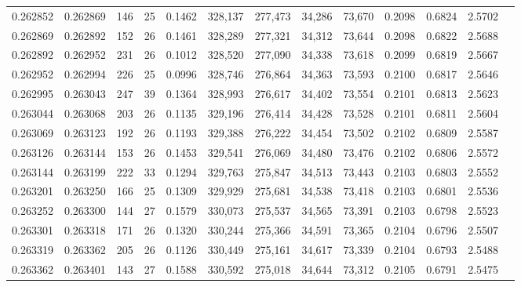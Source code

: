 \begin{tabular}{rrrrrrrrrrrrr}
0.262852 & 0.262869 &   146 &  25 &                                     0.1462 & 328,137 & 277,473 &  34,286 &  73,670 & 0.2098 & 0.6824 & 2.5702 \\
0.262869 & 0.262892 &   152 &  26 &                                     0.1461 & 328,289 & 277,321 &  34,312 &  73,644 & 0.2098 & 0.6822 & 2.5688 \\
0.262892 & 0.262952 &   231 &  26 &                                     0.1012 & 328,520 & 277,090 &  34,338 &  73,618 & 0.2099 & 0.6819 & 2.5667 \\
0.262952 & 0.262994 &   226 &  25 &                                     0.0996 & 328,746 & 276,864 &  34,363 &  73,593 & 0.2100 & 0.6817 & 2.5646 \\
0.262995 & 0.263043 &   247 &  39 &                                     0.1364 & 328,993 & 276,617 &  34,402 &  73,554 & 0.2101 & 0.6813 & 2.5623 \\
0.263044 & 0.263068 &   203 &  26 &                                     0.1135 & 329,196 & 276,414 &  34,428 &  73,528 & 0.2101 & 0.6811 & 2.5604 \\
0.263069 & 0.263123 &   192 &  26 &                                     0.1193 & 329,388 & 276,222 &  34,454 &  73,502 & 0.2102 & 0.6809 & 2.5587 \\
0.263126 & 0.263144 &   153 &  26 &                                     0.1453 & 329,541 & 276,069 &  34,480 &  73,476 & 0.2102 & 0.6806 & 2.5572 \\
0.263144 & 0.263199 &   222 &  33 &                                     0.1294 & 329,763 & 275,847 &  34,513 &  73,443 & 0.2103 & 0.6803 & 2.5552 \\
0.263201 & 0.263250 &   166 &  25 &                                     0.1309 & 329,929 & 275,681 &  34,538 &  73,418 & 0.2103 & 0.6801 & 2.5536 \\
0.263252 & 0.263300 &   144 &  27 &                                     0.1579 & 330,073 & 275,537 &  34,565 &  73,391 & 0.2103 & 0.6798 & 2.5523 \\
0.263301 & 0.263318 &   171 &  26 &                                     0.1320 & 330,244 & 275,366 &  34,591 &  73,365 & 0.2104 & 0.6796 & 2.5507 \\
0.263319 & 0.263362 &   205 &  26 &                                     0.1126 & 330,449 & 275,161 &  34,617 &  73,339 & 0.2104 & 0.6793 & 2.5488 \\
0.263362 & 0.263401 &   143 &  27 &                                     0.1588 & 330,592 & 275,018 &  34,644 &  73,312 & 0.2105 & 0.6791 & 2.5475 \\

\end{tabular}
